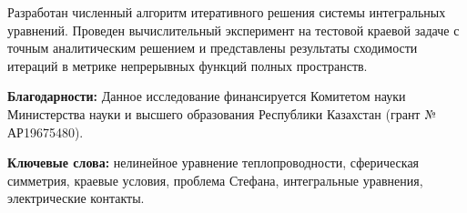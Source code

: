 \documentclass[12pt]{article}
\begin{document}
Разработан численный алгоритм итеративного решения системы интегральных уравнений. Проведен вычислительный эксперимент на тестовой краевой задаче с точным аналитическим решением и представлены результаты сходимости итераций в метрике непрерывных функций полных пространств.  

\textbf{Благодарности:}
 Данное исследование финансируется Комитетом науки Министерства науки и высшего образования Республики Казахстан (грант № АР19675480).

\textbf{Ключевые слова:} нелинейное уравнение теплопроводности, сферическая симметрия, краевые условия, проблема Стефана, интегральные уравнения, электрические контакты.

\end{document}
